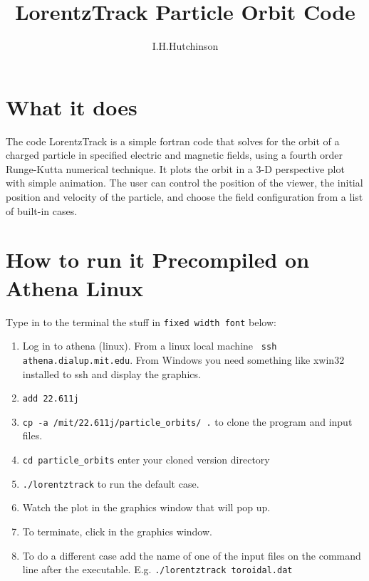\documentclass[12pt]{article}
\title{LorentzTrack Particle Orbit Code}
\author{I.H.Hutchinson}
\begin{document}
\maketitle
\section{What it does}

The code LorentzTrack is a simple fortran code that solves for the
orbit of a charged particle in specified electric and magnetic fields,
using a fourth order Runge-Kutta numerical technique. It plots the
orbit in a 3-D perspective plot with simple animation. The user can
control the position of the viewer, the initial position and velocity
of the particle, and choose the field configuration from a list of
built-in cases.

\section{How to run it Precompiled on Athena Linux}

Type in to the terminal the stuff in \verb!fixed width font! below:
\begin{enumerate}
\item Log in to athena (linux). From a linux local machine
  \verb! ssh athena.dialup.mit.edu!. 
  From Windows you need something like xwin32
  installed to ssh and display the graphics.
\item \verb!add 22.611j!
\item \verb!cp -a /mit/22.611j/particle_orbits/ .! to clone the
  program and input files.
\item \verb!cd particle_orbits! enter your cloned version directory
\item \verb!./lorentztrack! to run the
  default case.
\item Watch the plot in the graphics window that will pop up.
\item To terminate, click in the graphics window.
\item To do a different case add the name of one of the input files on
  the command line after the executable. E.g.
  \verb!./lorentztrack toroidal.dat!
\end{enumerate}
\end{document}
